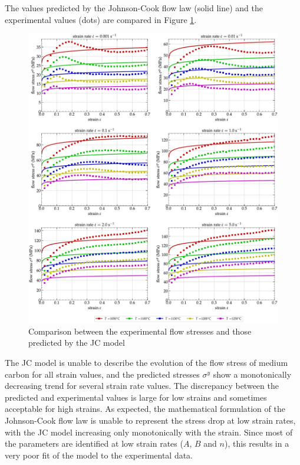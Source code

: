 \documentclass[twoside,english,1p,final,sort&compress]{elsarticle}
\theoremstyle{plain}
\begin{document}
The values predicted by the Johnson-Cook flow law (solid line) and the experimental values (dots) are compared in Figure \ref{fig:CompExp-JC-6}.
\begin{figure}[!ht]
\centering
\includegraphics[width=\columnwidth]{Figures/CompExp-JC-6}
\caption{Comparison between the experimental flow stresses and those predicted by the JC model}
\label{fig:CompExp-JC-6}
\end{figure}
The JC model is unable to describe the evolution of the flow stress of medium carbon for all strain values, and the predicted stresses $\sigma^y$ show a monotonically decreasing trend for several strain rate values.
The discrepancy between the predicted and experimental values is large for low strains and sometimes acceptable for high strains.
As expected, the mathematical formulation of the Johnson-Cook flow law is unable to represent the stress drop at low strain rates, with the JC model increasing only monotonically with the strain.
Since most of the parameters are identified at low strain rates ($A$, $B$ and $n$), this results in a very poor fit of the model to the experimental data.
\end{document}

